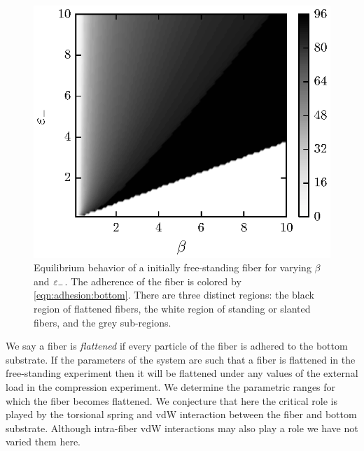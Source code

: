 	\begin{figure}[ht!]
		\begin{center}
			\includegraphics{./fig/ch3/fs/grid.eps}
		\end{center}		
		\caption{Equilibrium behavior of a initially free-standing fiber for varying $\beta$ and $\varepsilon_-$. The adherence of the fiber is colored by \ref{eqn:adhesion:bottom}. There are three distinct regions: the black region of flattened fibers, the white region of standing or slanted fibers, and the grey sub-regions.
		\label{fig:fs}}
	\end{figure}

We say a fiber is \textit{flattened} if every particle of the fiber is adhered to the bottom substrate. If the parameters of the system are such that a fiber is flattened in the free-standing experiment then it will be flattened under any values of the external load in the compression experiment. We determine the parametric ranges for which the fiber becomes flattened. We conjecture that here the critical role is played by the torsional spring and vdW interaction between the fiber and bottom substrate. Although intra-fiber vdW interactions may also play a role we have not varied them here.

